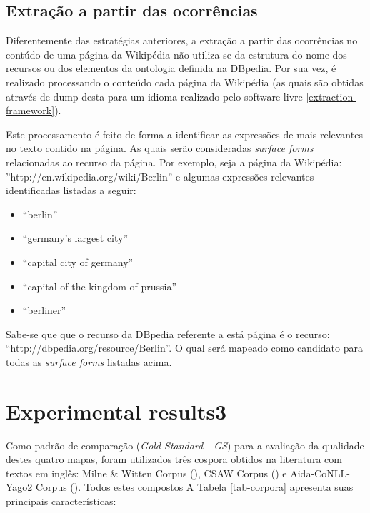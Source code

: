 \documentclass[10pt,a4paper]{llncs}
\begin{document}
{\subsection{Extração a partir das ocorrências} \label{extracao-ocorrencias}
\indent\indent Diferentemente das estratégias anteriores, a extração a partir das ocorrências no contúdo de uma página da Wikipédia não utiliza-se da estrutura do nome dos recursos ou dos elementos da ontologia definida na DBpedia. Por sua vez, é realizado processando o conteúdo cada página da Wikipédia (as quais são obtidas através de dump desta para um idioma realizado pelo software livre \ref{extraction-framework}).

Este processamento é feito de forma a identificar as expressões de mais relevantes no texto contido na página. As quais serão consideradas \textit{surface forms} relacionadas ao recurso da página. Por exemplo, seja a página da Wikipédia: ''http://en.wikipedia.org/wiki/Berlin'' e algumas expressões relevantes identificadas listadas a seguir:
\begin{itemize}
 \item ``berlin''
 \item ``germany's largest city''
 \item ``capital city of germany''
 \item ``capital of the kingdom of prussia''
 \item ``berliner''
\end{itemize}

Sabe-se que que o recurso da DBpedia referente a está página é o recurso: ``http://dbpedia.org/resource/Berlin''. O qual será mapeado como candidato para todas as \textit{surface forms} listadas acima.


\section{Experimental results3} \label{experimentos}
\indent\indent Como padrão de comparação (\textit{Gold Standard - GS}) para a avaliação da qualidade destes quatro mapas, foram utilizados três cospora obtidos na literatura com textos em inglês: Milne \& Witten Corpus (\cite{citep-MW-vide-apresentacao-spotters}), CSAW Corpus (\cite{citep-CSAW-vide-apresentacao-spotters}) e Aida-CoNLL-Yago2 Corpus (\cite{citep-MW-vide-apresentacao-spotters}). Todos estes compostos A Tabela \ref{tab-corpora} apresenta suas principais características:

}
\end{document}
